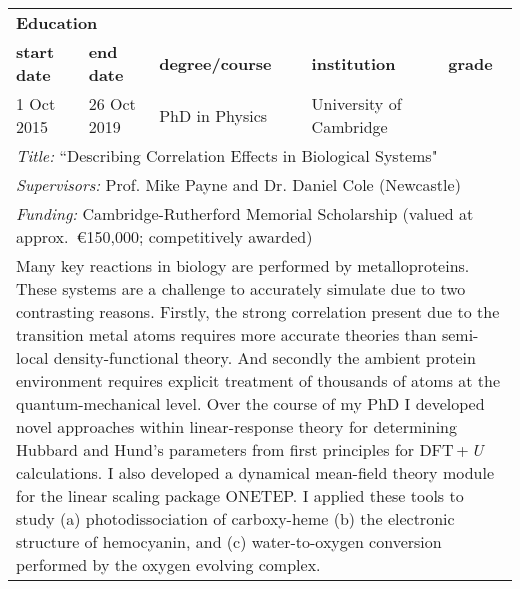 \documentclass[10pt,a4paper,final]{article}
\begin{document}
\begin{tabularx}{\textwidth}{l l l l l}
   \multicolumn{5}{l}{\cellcolor{seaborn_blue}\large\textbf{\textcolor{seaborn_bg_grey_half}{Education}}}                                                                                                                                                            \\
   \rowcolor{seaborn_bg_grey_half}\textbf{start date}                                                                 & \textbf{end date}                                                        & \textbf{degree/course} & \textbf{institution}    & \textbf{grade} \\
   \rowcolor{seaborn_bg_grey}
   1 Oct 2015                                                                                                         & 26 Oct 2019                                                              & PhD in Physics         & University of Cambridge &                \\*
   \multicolumn{5}{X}{\cellcolor{seaborn_bg_grey}%
      \textit{Title:} ``Describing Correlation Effects in Biological Systems"
   }                                                                                                                                                                                                                                                                 \\
   \multicolumn{5}{X}{\cellcolor{seaborn_bg_grey}%
      \textit{Supervisors:} Prof. Mike Payne and Dr. Daniel Cole (Newcastle)
   }                                                                                                                                                                                                                                                                 \\
   \multicolumn{5}{X}{\cellcolor{seaborn_bg_grey}%
      \textit{Funding:} Cambridge-Rutherford Memorial Scholarship (valued at approx.\ \euro{}150,000; competitively awarded)
   }                                                                                                                                                                                                                                                                 \\
   \multicolumn{5}{X}{\cellcolor{seaborn_bg_grey}%
      Many key reactions in biology are performed by metalloproteins. These systems are a challenge to accurately simulate due to two contrasting reasons. Firstly, the strong correlation present due to the transition metal atoms requires more accurate theories than semi-local density-functional theory. And secondly the ambient protein environment requires explicit treatment of thousands of atoms at the quantum-mechanical level. Over the course of my PhD I developed novel approaches within linear-response theory for determining Hubbard and Hund's parameters from first principles for DFT\,+\,\emph{U} calculations. I also developed a dynamical mean-field theory module for the linear scaling package ONETEP. I applied these tools to study (a) photodissociation of carboxy-heme (b) the electronic structure of hemocyanin, and (c) water-to-oxygen conversion performed by the oxygen evolving complex.
}
\end{tabularx}
\end{document}
